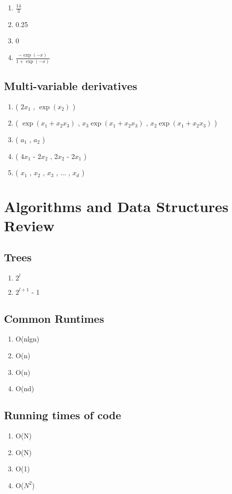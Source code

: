 \documentclass{article}
\begin{document}
\begin{enumerate}
\item $\frac{14}{3}$
\item 0.25
\item 0
\item $\frac{-\exp(-x)}{1+\exp(-x)}$
\end{enumerate}

\subsection{Multi-variable derivatives}
\begin{enumerate}
\item ( $2x_1$ , $\exp(x_2)$ )
\item ( $\exp(x_1 + x_2x_3)$ , $x_3\exp(x_1 + x_2x_3)$ , $x_2\exp(x_1 + x_2x_3)$ )
\item ( $a_1$ , $a_2$ )
\item ( 4$x_1$ - 2$x_2$ , 2$x_2$ - 2$x_1$ )
\item ( $x_1$ , $x_2$ , $x_3$ , ... , $x_d$ )
\end{enumerate}



\section{Algorithms and Data Structures Review}

\subsection{Trees}

\begin{enumerate}
\item $2^l$
\item $2^{l+1}$ - 1
\end{enumerate}

\subsection{Common Runtimes}
\begin{enumerate}
\item O(nlgn)
\item O(n)
\item O(n)
\item O(nd)
\end{enumerate}

\subsection{Running times of code}
\begin{enumerate}
\item O(N)
\item O(N)
\item O(1)
\item O($N^2$)
\end{enumerate}
\end{document}
